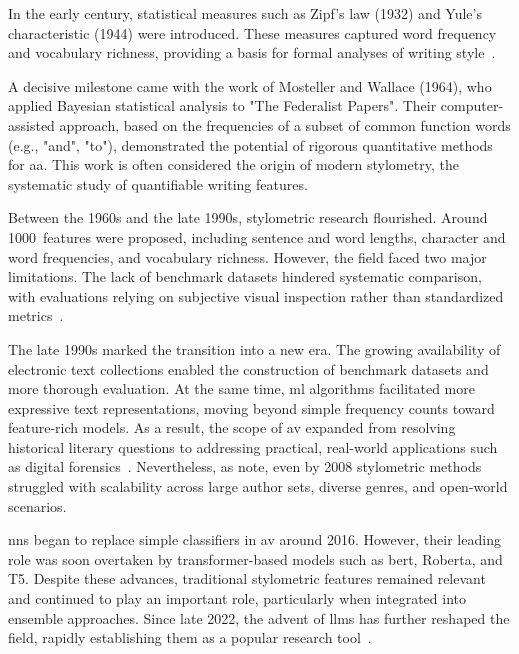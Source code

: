 
In the early  century, statistical measures such as Zipf's law (1932) and Yule's characteristic (1944) were introduced. 
These measures captured word frequency and vocabulary richness, providing a basis for formal analyses of writing style~\citep{neal_surveying_2018,stamatatos_survey_2009}.

A decisive milestone came with the work of Mosteller and Wallace (1964), who applied Bayesian statistical analysis to "The Federalist Papers".
Their computer-assisted approach, based on the frequencies of a subset of common function words (e.g., "and", "to"), demonstrated the potential of rigorous quantitative methods for \ac{aa}. 
This work is often considered the origin of modern stylometry, the systematic study of quantifiable writing features.

Between the 1960s and the late 1990s, stylometric research flourished.
Around \num{1000}~features were proposed, including sentence and word lengths, character and word frequencies, and vocabulary richness. 
However, the field faced two major limitations. 
The lack of benchmark datasets hindered systematic comparison, with evaluations relying on subjective visual inspection rather than standardized metrics~\citep{stamatatos_survey_2009}.

The late 1990s marked the transition into a new era. 
The growing availability of electronic text collections enabled the construction of benchmark datasets and more thorough evaluation. 
At the same time, \ac{ml} algorithms facilitated more expressive text representations, moving beyond simple frequency counts toward feature-rich models. 
As a result, the scope of \ac{av} expanded from resolving historical literary questions to addressing practical, real-world applications such as digital forensics~\citep{stamatatos_survey_2009}. 
Nevertheless, as \citet{abbasi_writeprints_2008} note, even by 2008 stylometric methods struggled with scalability across large author sets, diverse genres, and open-world scenarios.

\acp{nn} began to replace simple classifiers in \ac{av} around 2016. 
However, their leading role was soon overtaken by transformer-based models such as \acs{bert}, Ro\ac{bert}a, and T5. 
Despite these advances, traditional stylometric features remained relevant and continued to play an important role, particularly when integrated into ensemble approaches. 
Since late 2022, the advent of \acp{llm} has further reshaped the field, rapidly establishing them as a popular research tool~\citep{schmidt_llm_av_latin_24}.
